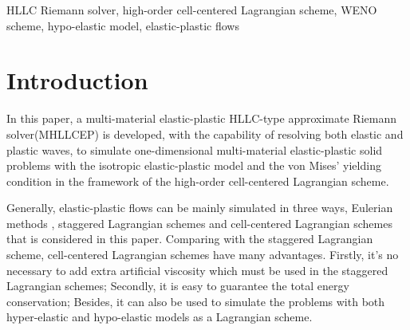 \documentclass[review]{elsarticle}
\begin{document}
\begin{keyword}
  HLLC Riemann solver, high-order cell-centered Lagrangian scheme,  WENO scheme,  hypo-elastic model, elastic-plastic flows
\end{keyword}


\section{Introduction}

In this paper, a multi-material elastic-plastic HLLC-type approximate Riemann solver(MHLLCEP) is developed, with the capability of resolving both elastic and plastic waves, to simulate one-dimensional  multi-material elastic-plastic solid problems with the isotropic elastic-plastic model \cite{wilkins1963calculation} and  the von Mises' yielding condition in the framework of the  high-order cell-centered Lagrangian scheme.

Generally, elastic-plastic flows can be mainly simulated in three ways, Eulerian methods \cite{trangenstein1991higher,miller2001high,barton2009exact}, staggered Lagrangian schemes \cite{wilkins1963calculation} and cell-centered Lagrangian schemes \cite{burton2013cell,kluth2010discretization,maire2013nominally,cheng2017third} that  is considered in this paper. Comparing with the staggered Lagrangian scheme, cell-centered Lagrangian  schemes  have many advantages. Firstly, it's no necessary to add  extra artificial viscosity  which  must be used in the staggered Lagrangian schemes; Secondly, it is easy to guarantee the total energy conservation; Besides, it can also be used to simulate the problems with both  hyper-elastic and hypo-elastic models  \cite{burton2013cell,kluth2010discretization,maire2013nominally,cheng2017third}  as a Lagrangian scheme.
\end{document}
